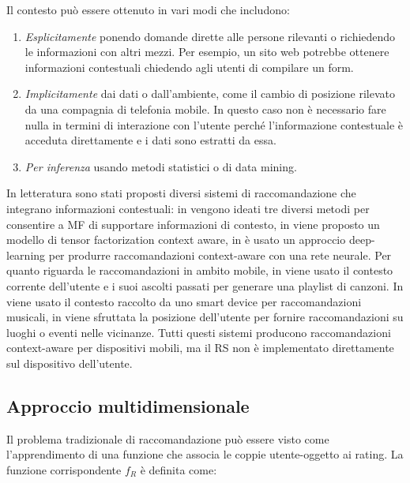 \noindent Il contesto può essere ottenuto in vari modi \cite{recsys-handbook} che includono:
\begin{enumerate}
 \item \textit{Esplicitamente} ponendo domande dirette alle persone rilevanti o richiedendo le informazioni con altri mezzi. Per esempio, un sito web potrebbe ottenere informazioni contestuali chiedendo agli utenti di compilare un form.
 \item \textit{Implicitamente} dai dati o dall'ambiente, come il cambio di posizione rilevato da una compagnia di telefonia mobile. In questo caso non è necessario fare nulla in termini di interazione con l'utente perché l'informazione contestuale è acceduta direttamente e i dati sono estratti da essa.
 \item \textit{Per inferenza} usando metodi statistici o di data mining. 
\end{enumerate}
In letteratura sono stati proposti diversi sistemi di raccomandazione che integrano informazioni contestuali: in \cite{mf-context-aware} vengono ideati tre diversi metodi per consentire a MF di supportare informazioni di contesto, in \cite{tensor-context-aware} viene proposto un modello di tensor factorization context aware, in \cite{context-aware-deep-learning} è usato un approccio deep-learning per produrre raccomandazioni context-aware con una rete neurale. Per quanto riguarda le raccomandazioni in ambito mobile, in \cite{cars-music2} viene usato il contesto corrente dell'utente e i suoi ascolti passati per generare una playlist di canzoni. In \cite{cars-music} viene usato il contesto raccolto da uno smart device per raccomandazioni musicali, in \cite{cars-location} viene sfruttata la posizione dell'utente per fornire raccomandazioni su luoghi o eventi nelle vicinanze. Tutti questi sistemi producono raccomandazioni context-aware per dispositivi mobili, ma il RS non è implementato direttamente sul dispositivo dell'utente.

\subsection{Approccio multidimensionale} \label{subsec:multidim}
Il problema tradizionale di raccomandazione può essere visto come l'apprendimento di una funzione che associa le coppie utente-oggetto ai rating. La funzione corrispondente $f_R$ è definita come:

